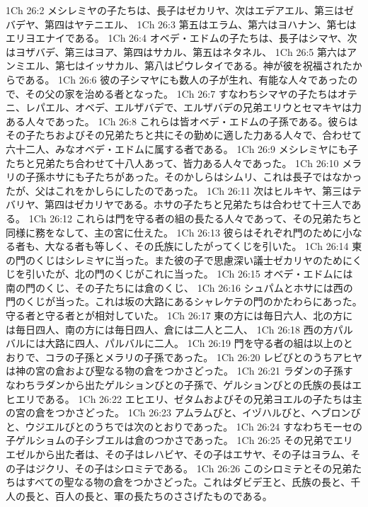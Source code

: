 1Ch 26:2  メシレミヤの子たちは、長子はゼカリヤ、次はエデアエル、第三はゼバデヤ、第四はヤテニエル、
1Ch 26:3  第五はエラム、第六はヨハナン、第七はエリヨエナイである。
1Ch 26:4  オベデ・エドムの子たちは、長子はシマヤ、次はヨザバデ、第三はヨア、第四はサカル、第五はネタネル、
1Ch 26:5  第六はアンミエル、第七はイッサカル、第八はピウレタイである。神が彼を祝福されたからである。
1Ch 26:6  彼の子シマヤにも数人の子が生れ、有能な人々であったので、その父の家を治める者となった。
1Ch 26:7  すなわちシマヤの子たちはオテニ、レパエル、オベデ、エルザバデで、エルザバデの兄弟エリウとセマキヤは力ある人々であった。
1Ch 26:8  これらは皆オベデ・エドムの子孫である。彼らはその子たちおよびその兄弟たちと共にその勤めに適した力ある人々で、合わせて六十二人、みなオベデ・エドムに属する者である。
1Ch 26:9  メシレミヤにも子たちと兄弟たち合わせて十八人あって、皆力ある人々であった。
1Ch 26:10  メラリの子孫ホサにも子たちがあった。そのかしらはシムリ、これは長子ではなかったが、父はこれをかしらにしたのであった。
1Ch 26:11  次はヒルキヤ、第三はテバリヤ、第四はゼカリヤである。ホサの子たちと兄弟たちは合わせて十三人である。
1Ch 26:12  これらは門を守る者の組の長たる人々であって、その兄弟たちと同様に務をなして、主の宮に仕えた。
1Ch 26:13  彼らはそれぞれ門のために小なる者も、大なる者も等しく、その氏族にしたがってくじを引いた。
1Ch 26:14  東の門のくじはシレミヤに当った。また彼の子で思慮深い議士ゼカリヤのためにくじを引いたが、北の門のくじがこれに当った。
1Ch 26:15  オベデ・エドムには南の門のくじ、その子たちには倉のくじ、
1Ch 26:16  シュパムとホサには西の門のくじが当った。これは坂の大路にあるシャレケテの門のかたわらにあった。守る者と守る者とが相対していた。
1Ch 26:17  東の方には毎日六人、北の方には毎日四人、南の方には毎日四人、倉には二人と二人、
1Ch 26:18  西の方パルバルには大路に四人、パルバルに二人。
1Ch 26:19  門を守る者の組は以上のとおりで、コラの子孫とメラリの子孫であった。
1Ch 26:20  レビびとのうちアヒヤは神の宮の倉および聖なる物の倉をつかさどった。
1Ch 26:21  ラダンの子孫すなわちラダンから出たゲルションびとの子孫で、ゲルションびとの氏族の長はエヒエリである。
1Ch 26:22  エヒエリ、ゼタムおよびその兄弟ヨエルの子たちは主の宮の倉をつかさどった。
1Ch 26:23  アムラムびと、イヅハルびと、ヘブロンびと、ウジエルびとのうちでは次のとおりであった。
1Ch 26:24  すなわちモーセの子ゲルショムの子シブエルは倉のつかさであった。
1Ch 26:25  その兄弟でエリエゼルから出た者は、その子はレハビヤ、その子はエサヤ、その子はヨラム、その子はジクリ、その子はシロミテである。
1Ch 26:26  このシロミテとその兄弟たちはすべての聖なる物の倉をつかさどった。これはダビデ王と、氏族の長と、千人の長と、百人の長と、軍の長たちのささげたものである。
